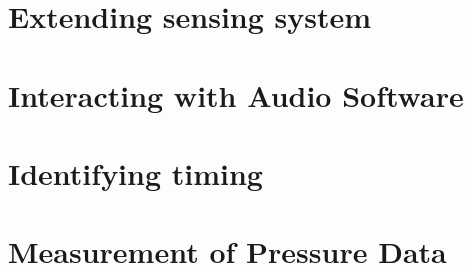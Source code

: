 \section{Extending sensing system}
\section{Interacting with Audio Software}
\section{Identifying timing}
\section{Measurement of Pressure Data}